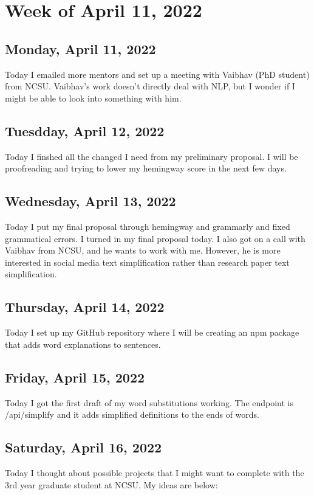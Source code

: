 \documentclass[11pt,letterpaper]{article}
\begin{document}
\section{Week of April 11, 2022}
\subsection{Monday, April 11, 2022}
Today I emailed more mentors and set up a meeting with Vaibhav (PhD student) from NCSU. Vaibhav's work doesn't directly deal with NLP, but I wonder if I might be able to look into something with him.

\subsection{Tuesdday, April 12, 2022}
Today I finshed all the changed I need from my preliminary proposal. I will be proofreading and trying to lower my hemingway score in the next few days.

\subsection{Wednesday, April 13, 2022}
Today I put my final proposal through hemingway and grammarly and fixed grammatical errors. I turned in my final proposal today. I also got on a call with Vaibhav from NCSU, and he wants to work with me. However, he is more interested in social media text simplification rather than research paper text simplification.

\subsection{Thursday, April 14, 2022}
Today I set up my GitHub repository where I will be creating an npm package that adds word explanations to sentences.


\subsection{Friday, April 15, 2022}
Today I got the first draft of my word substitutions working. The endpoint is /api/simplify and it adds simplified definitions to the ends of words.

\subsection{Saturday, April 16, 2022}
Today I thought about possible projects that I might want to complete with the 3rd year graduate student at NCSU. My ideas are below:
\end{document}
